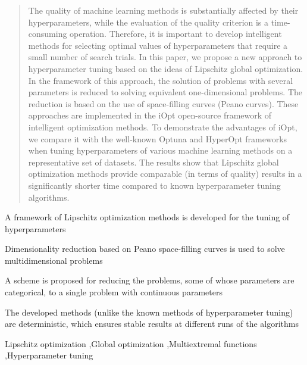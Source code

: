 \documentclass[preprint,12pt]{elsarticle}
\begin{document}
\begin{frontmatter}
\begin{abstract}

The quality of machine learning methods is substantially affected by their hyperparameters, while the evaluation of the quality criterion is a time-consuming operation. Therefore, it is important to develop intelligent methods for selecting optimal values of hyperparameters that require a small number of search trials. In this paper, we propose a new approach to hyperparameter tuning based on the ideas of Lipschitz global optimization. In the framework of this approach, the solution of problems with several parameters is reduced to solving equivalent one-dimensional problems. The reduction is based on the use of space-filling curves (Peano curves). These approaches are implemented in the iOpt open-source framework of intelligent optimization methods.  To demonstrate the advantages of iOpt, we compare it with the well-known Optuna and HyperOpt frameworks when tuning hyperparameters of various machine learning methods on a representative set of datasets. The results show that Lipschitz global optimization methods provide comparable (in terms of quality) results in a significantly shorter time compared to known hyperparameter tuning algorithms.

\end{abstract}


\begin{highlights}
\item A framework of Lipschitz optimization methods is developed for the tuning of hyperparameters
\item Dimensionality reduction based on Peano space-filling curves is used to solve multidimensional problems
\item A scheme is proposed for reducing the problems, some of whose parameters are categorical, to a single problem with continuous parameters
\item The developed methods (unlike the known methods of hyperparameter tuning) are deterministic, which ensures stable results at different runs of the algorithms 

\end{highlights}

\begin{keyword}
Lipschitz optimization \sep Global optimization \sep Multiextremal functions \sep Hyperparameter tuning



\end{keyword}

\end{frontmatter}
\end{document}
